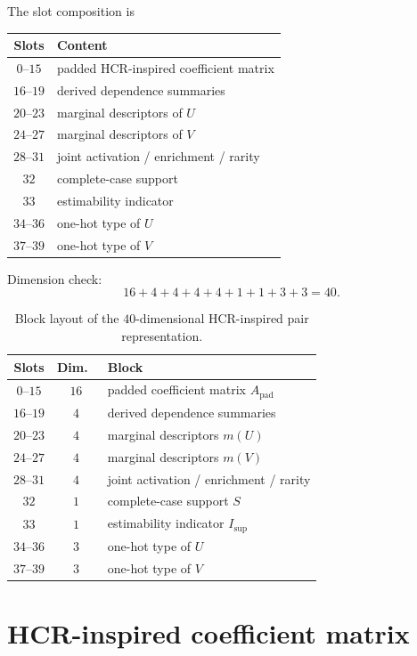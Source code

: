 The slot composition is
\begin{center}
\begin{tabular}{@{}cl@{}}
\toprule
Slots & Content \\
\midrule
$0$--$15$ & padded HCR-inspired coefficient matrix \\
$16$--$19$ & derived dependence summaries \\
$20$--$23$ & marginal descriptors of $U$ \\
$24$--$27$ & marginal descriptors of $V$ \\
$28$--$31$ & joint activation / enrichment / rarity \\
$32$ & complete-case support \\
$33$ & estimability indicator \\
$34$--$36$ & one-hot type of $U$ \\
$37$--$39$ & one-hot type of $V$ \\
\bottomrule
\end{tabular}
\end{center}
Dimension check:
\begin{equation}
16+4+4+4+4+1+1+3+3=40.
\end{equation}

\begin{table}[htbp]
\centering
\small
\caption{Block layout of the $40$-dimensional HCR-inspired pair representation.}
\label{tab:app-hcr40-blocks}
\begin{tabular}{@{}ccl@{}}
\toprule
Slots & Dim.\ & Block \\
\midrule
$0$--$15$ & $16$ & padded coefficient matrix $A_{\mathrm{pad}}$ \\
$16$--$19$ & $4$ & derived dependence summaries \\
$20$--$23$ & $4$ & marginal descriptors $m(U)$ \\
$24$--$27$ & $4$ & marginal descriptors $m(V)$ \\
$28$--$31$ & $4$ & joint activation / enrichment / rarity \\
$32$ & $1$ & complete-case support $S$ \\
$33$ & $1$ & estimability indicator $I_{\mathrm{sup}}$ \\
$34$--$36$ & $3$ & one-hot type of $U$ \\
$37$--$39$ & $3$ & one-hot type of $V$ \\
\bottomrule
\end{tabular}
\end{table}

\section{HCR-inspired coefficient matrix}
\label{app:hcr-matrix}

